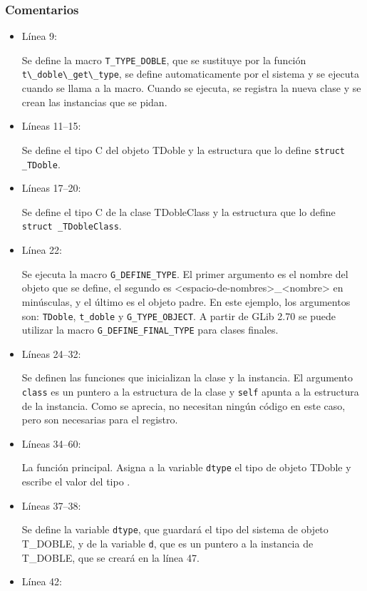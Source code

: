 \subsubsection{Comentarios}
\begin{itemize}
\item Línea 9:\par
  Se define la macro \texttt{T\_TYPE\_DOBLE}, que se sustituye por la función
  \passthrough{\lstinline!t\_doble\_get\_type!}, se define automaticamente por el sistema y se ejecuta cuando
  se llama a la macro. Cuando se ejecuta, se registra la nueva clase y se crean las instancias que se pidan.
\item Líneas 11--15:\par
  Se define el tipo C del objeto \textsf{TDoble} y la estructura que lo define \texttt{struct \_TDoble}.
\item Líneas 17--20:\par
  Se define el tipo C de la clase \textsf{TDobleClass} y la estructura que lo define \texttt{struct \_TDobleClass}.
\item Línea 22:\par
  Se ejecuta la macro \texttt{G\_DEFINE\_TYPE}. El primer argumento es el nombre del objeto que se define,
  el segundo es \textsf{<espacio-de-nombres>\_<nombre>} en minúsculas, y el último es el objeto padre.
  En este ejemplo, los argumentos son: \texttt{TDoble}, \texttt{t\_doble} y \texttt{G\_TYPE\_OBJECT}.
  A partir de \textsf{GLib 2.70} se puede utilizar la macro \texttt{G\_DEFINE\_FINAL\_TYPE} para clases finales.
\item Líneas 24--32:\par
  Se definen las funciones que inicializan la clase y la instancia. El argumento \texttt{class} es un puntero a la
  estructura de la clase y \texttt{self} apunta a la estructura de la instancia. Como se aprecia, no
  necesitan ningún código en este caso, pero son necesarias para el registro.
\item Líneas 34--60:\par
  La función principal. Asigna a la variable \texttt{dtype} el tipo de objeto \textsf{TDoble} y escribe el valor
  del tipo .
\item Líneas 37--38:\par
  Se define la variable \texttt{dtype}, que guardará el tipo del sistema de objeto \textsf{T\_DOBLE}, y de la
  variable \texttt{d}, que es un puntero a la instancia de \textsf{T\_DOBLE}, que se creará en la línea 47.
\item Línea 42:\par

\end{itemize}
